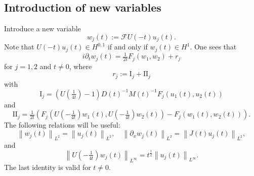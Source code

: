 \documentclass[11pt,a4paper,oneside]{amsart}
\theoremstyle{plain}
\theoremstyle{remark}
\numberwithin{equation}{section}
\newcommand{\F}{\mathcal{F}}
\newcommand{\norm}[1]{\left\lVert #1\right\rVert}
\def \F{\mathcal{F}}
\theoremstyle{definition}
\begin{document}
\subsection{Introduction of new variables}

Introduce a new variable
\begin{equation}\label{E:wdef}
w_j(t):=\mathcal{F} U(-t) u_j(t).
\end{equation}
Note that $U(-t) u_j(t) \in H^{0,1}$ if and only if $w_j(t) \in H^1$.
One sees that
\begin{equation}\label{E:wsys}
	i \partial_t w_j(t) 
	= 
	\tfrac1{2t} F_j(w_1,w_2) + r_j
\end{equation}
for $j=1,2$ and $t\neq0$,
where 
\begin{equation}\label{E:rdef}
r_j:=\mathrm{I}_j + \mathrm{II}_j
\end{equation}
 with
\[
	\mathrm{I}_j = (U(\tfrac1{4t})-1) D(t)^{-1} M(t)^{-1} F_j(u_1(t),u_2(t))
\]
and
\[
	\mathrm{II}_j
= \tfrac1{2t} (
F_j(U(-\tfrac1{4t}) w_1(t),U(-\tfrac1{4t}) w_2(t)) - F_j(w_1(t), w_2(t))).
\]
The following relations will be useful:
\begin{equation}\label{E:uwrelation1}
	\norm{w_j(t)}_{L^2} = \norm{u_j(t)}_{L^2},
\quad
	\norm{\partial_x w_j (t)}_{L^2} = \norm{J(t)u_j(t)}_{L^2},
\end{equation}
and
\begin{equation}\label{E:uwrelation2}
	\norm{U(-\tfrac1{4t}) w_j(t)}_{L^\infty}
		= t^{\frac12} \norm{u_j(t)}_{L^\infty}.
\end{equation}
The last identity is valid for $t\neq0$.
\end{document}
